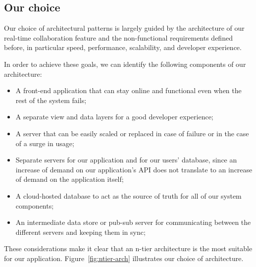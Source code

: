 \begin{toexclude}
  \subsection{Our choice}

  Our choice of architectural patterns is largely guided by the architecture of our real-time collaboration feature and the non-functional requirements defined before, in particular speed, performance, scalability, and developer experience.

  In order to achieve these goals, we can identify the following components of our architecture:

  \begin{itemize}
    \item A front-end application that can stay online and functional even when the rest of the system fails;
    \item A separate view and data layers for a good developer experience;
    \item A server that can be easily scaled or replaced in case of failure or in the case of a surge in usage;
    \item Separate servers for our application and for our users' database, since an increase of demand on our application's API does not translate to an increase of demand on the application itself;
    \item A cloud-hosted database to act as the source of truth for all of our system components;
    \item An intermediate data store or pub-sub server for communicating between the different servers and keeping them in sync;
  \end{itemize}

  These considerations make it clear that an n-tier architecture is the most suitable for our application. Figure~\ref{fig:ntier-arch} illustrates our choice of architecture.


  \begin{figure}[H]
    \centerfloat
    \sffamily
\end{figure}
\end{toexclude}

